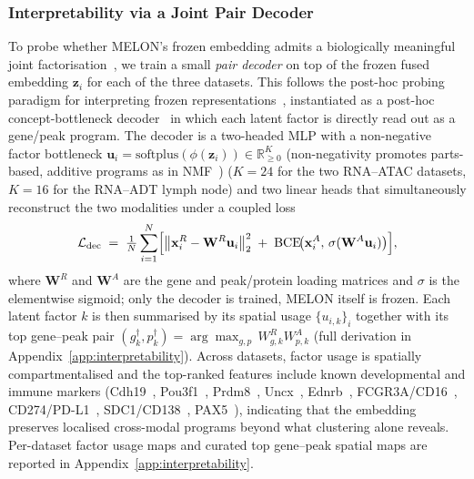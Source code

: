\documentclass{article}
\theoremstyle{plain}
\theoremstyle{definition}
\begin{document}
\subsubsection{Interpretability via a Joint Pair Decoder}
To probe whether MELON's frozen embedding admits a biologically meaningful joint factorisation~\cite{doshivelez2017rigorous,rudin2019stop}, we train a small \emph{pair decoder} on top of the frozen fused embedding $\mathbf{z}_i$ for each of the three datasets. This follows the post-hoc probing paradigm for interpreting frozen representations~\cite{alain2017probes}, instantiated as a post-hoc concept-bottleneck decoder~\cite{koh2020concept,yuksekgonul2023pcbm,svensson2020ldvae} in which each latent factor is directly read out as a gene/peak program. The decoder is a two-headed MLP with a non-negative factor bottleneck $\mathbf{u}_i = \mathrm{softplus}(\phi(\mathbf{z}_i)) \in \mathbb{R}_{\geq 0}^{K}$ (non-negativity promotes parts-based, additive programs as in NMF~\cite{lee1999nmf}) ($K{=}24$ for the two RNA--ATAC datasets, $K{=}16$ for the RNA--ADT lymph node) and two linear heads that simultaneously reconstruct the two modalities under a coupled loss
\begin{equation}\label{eq:pair-decoder-main}
    \mathcal{L}_{\text{dec}}
    \;=\;
    \tfrac{1}{N}\sum_{i=1}^{N}\Bigl[
        \bigl\|\mathbf{x}^{R}_i - \mathbf{W}^{R}\mathbf{u}_i\bigr\|_{2}^{2}
        \;+\;
        \mathrm{BCE}\!\bigl(\mathbf{x}^{A}_i,\,\sigma(\mathbf{W}^{A}\mathbf{u}_i)\bigr)
    \Bigr],
\end{equation}
where $\mathbf{W}^{R}$ and $\mathbf{W}^{A}$ are the gene and peak/protein loading matrices and $\sigma$ is the elementwise sigmoid; only the decoder is trained, MELON itself is frozen. Each latent factor $k$ is then summarised by its spatial usage $\{u_{i,k}\}_i$ together with its top gene--peak pair $(g^{\dagger}_k,p^{\dagger}_k) = \arg\max_{g,p}\,W^{R}_{g,k}W^{A}_{p,k}$ (full derivation in Appendix~\ref{app:interpretability}). Across datasets, factor usage is spatially compartmentalised and the top-ranked features include known developmental and immune markers (Cdh19~\cite{simoes2015neural}, Pou3f1~\cite{zhu2014pou3f1}, Prdm8~\cite{ross2012prdm8}, Uncx~\cite{mansouri1997uncx}, Ednrb~\cite{baynash1994ednrb}, FCGR3A/CD16~\cite{bruhns2012fcgr}, CD274/PD-L1~\cite{dong1999pdl1}, SDC1/CD138~\cite{wijdenes1996cd138}, PAX5~\cite{nutt1999pax5}), indicating that the embedding preserves localised cross-modal programs beyond what clustering alone reveals. Per-dataset factor usage maps and curated top gene--peak spatial maps are reported in Appendix~\ref{app:interpretability}.
\end{document}
